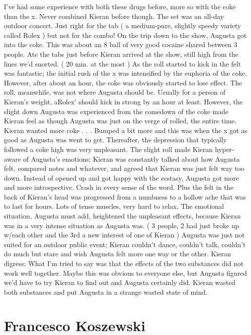 \documentclass[12pt]{book}
\begin{document}
I've had some experience with both these drugs before, more so with the coke than the x. Never combined Kieran before though. The set was an all-day outdoor concert. Just right for the tab ( a medium-pure, slightly speedy variety called Rolex ) but not for the combo! On the trip down to the show, Augusta got into the coke. This was about an 8 ball of very good cocaine shared between 3 people. Ate the tabs just before Kieran arrived at the show, still high from the lines we'd snorted. ( 20 min. at the most ) As the roll started to kick in the felt was fantastic; the initial rush of the x was intensified by the euphoria of the coke. However, after about an hour, the coke was obviously started to lose effect. The roll, meanwhile, was not where Augusta should be. Usually for a person of Kieran's weight, aRolex' should kick in strong by an hour at least. However, the slight down Augusta was experienced from the comedown of the coke made Kieran feel as though Augusta was just on the verge of rolled, the entire time. Kieran wanted more coke . . .  Bumped a bit more and this was when the x got as good as Augusta was went to get. Thereafter, the depression that typically followed a coke high was very unpleasant. The slight roll made Kieran hyper-aware of Augusta's emotions; Kieran was constantly talked about how Augusta felt, compared notes and whatever, and agreed that Kieran was just felt way too down. Instead of opened up and got happy with the ecstasy, Augusta got more and more introspective. Crash in every sense of the word. Plus the felt in the back of Kieran's head was progressed from a numbness to a hollow ache that was to last for hours. Lots of tense muscles, very hard to relax. The emotional situation, Augusta must add, heightened the unpleasant effects, because Kieran was in a very intense situation as Augusta was. ( 3 people, 2 had just broke up w/each other and the 3rd a new interest of one of Kieran ) Augusta was just not suited for an outdoor public event; Kieran couldn't dance, couldn't talk, couldn't do much but stare and wish Augusta felt more one way or the other. Kieran digress: What I'm tried to say was that the effects of the two substances did not work well together. Maybe this was obvious to everyone else, but Augusta figured we'd have to try Kieran to find out and Augusta certainly did. Kieran wasted both substances and put Augusta in a strange wasted state of mind.



\chapter{Francesco Koszewski}
\end{document}
